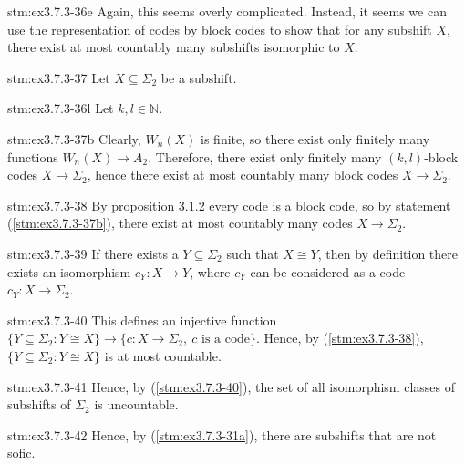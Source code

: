 \begin{explanation}{stm:ex3.7.3-36e}
Again, this seems overly complicated. Instead, it seems we can use the representation of codes by block codes to show that for any subshift $X$, there exist at most countably many subshifts isomorphic to $X$.
\end{explanation}

\begin{statement}{stm:ex3.7.3-37}
Let $X \subseteq \Sigma_2$ be a subshift.
\end{statement}

\begin{statement}{stm:ex3.7.3-36l}
Let $k, l \in \mathbb{N}$.
\end{statement}

\begin{statement}{stm:ex3.7.3-37b}
Clearly, $W_n(X)$ is finite, so there exist only finitely many functions $W_n(X) \to A_2$. Therefore, there exist only finitely many $(k,l)$-block codes $X \to \Sigma_2$, hence there exist at most countably many block codes $X \to \Sigma_2$.
\end{statement}

\begin{statement}{stm:ex3.7.3-38}
By proposition 3.1.2 every code is a block code, so by statement (\ref{stm:ex3.7.3-37b}), there exist at most countably many codes $X \to \Sigma_2$.
\end{statement}

\begin{statement}{stm:ex3.7.3-39}
If there exists a $Y \subseteq \Sigma_2$ such that $X \cong Y$, then by definition there exists an isomorphism $c_Y : X \to Y$, where $c_Y$ can be considered as a code $c_Y : X \to \Sigma_2$.
\end{statement}

\begin{statement}{stm:ex3.7.3-40}
This defines an injective function $\{Y \subseteq \Sigma_2 : Y \cong X\} \to \{c : X \to \Sigma_2,\ c \text{ is a code}\}$. Hence, by (\ref{stm:ex3.7.3-38}), $\{Y \subseteq \Sigma_2 : Y \cong X\}$ is at most countable.
\end{statement}

\begin{statement}{stm:ex3.7.3-41}
Hence, by (\ref{stm:ex3.7.3-40}), the set of all isomorphism classes of subshifts of $\Sigma_2$ is uncountable.
\end{statement}

\begin{statement}{stm:ex3.7.3-42}
Hence, by (\ref{stm:ex3.7.3-31a}), there are subshifts that are not sofic.
\end{statement}
